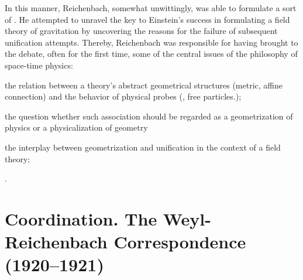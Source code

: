 \documentclass[draft]{article}
\begin{document}

In this manner, Reichenbach, somewhat unwittingly, was able to formulate a sort of  \citep{Lehmkuhl2017}. He attempted to unravel the key to Einstein's success in formulating a field theory of gravitation by uncovering the reasons for the failure of subsequent unification attempts. Thereby, Reichenbach was responsible for having brought to the debate, often for the first time, some of the central issues of the philosophy of space-time physics: \begin{inparaenum}[(a)] \item the relation between a theory's abstract geometrical structures (metric, affine connection) and the behavior of physical probes (\rac, free particles\etc.); \item the question whether such association should be regarded as a geometrization of physics or a physicalization of geometry \item the interplay between geometrization and unification in the context of a field theory; \end{inparaenum}. 

\section{Coordination. The Weyl-Reichenbach Correspondence (1920--1921)}
\label{Coordination}

\end{document}
